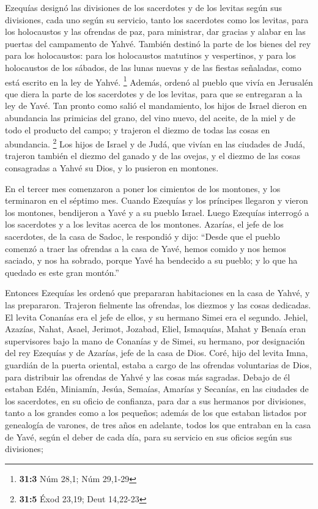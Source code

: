  Ezequías designó las divisiones de los sacerdotes y de
los levitas según sus divisiones, cada uno según su servicio, tanto los
sacerdotes como los levitas, para los holocaustos y las ofrendas de paz,
para ministrar, dar gracias y alabar en las puertas del campamento de
Yahvé.  También destinó la parte de los bienes del rey
para los holocaustos: para los holocaustos matutinos y vespertinos, y
para los holocaustos de los sábados, de las lunas nuevas y de las
fiestas señaladas, como está escrito en la ley de Yahvé. \footnote{\textbf{31:3}
  Núm 28,1; Núm 29,1-29}  Además, ordenó al pueblo que
vivía en Jerusalén que diera la parte de los sacerdotes y de los
levitas, para que se entregaran a la ley de Yavé.  Tan
pronto como salió el mandamiento, los hijos de Israel dieron en
abundancia las primicias del grano, del vino nuevo, del aceite, de la
miel y de todo el producto del campo; y trajeron el diezmo de todas las
cosas en abundancia. \footnote{\textbf{31:5} Éxod 23,19; Deut 14,22-23}
 Los hijos de Israel y de Judá, que vivían en las ciudades
de Judá, trajeron también el diezmo del ganado y de las ovejas, y el
diezmo de las cosas consagradas a Yahvé su Dios, y lo pusieron en
montones.

 En el tercer mes comenzaron a poner los cimientos de los
montones, y los terminaron en el séptimo mes.  Cuando
Ezequías y los príncipes llegaron y vieron los montones, bendijeron a
Yavé y a su pueblo Israel.  Luego Ezequías interrogó a los
sacerdotes y a los levitas acerca de los montones. 
Azarías, el jefe de los sacerdotes, de la casa de Sadoc, le respondió y
dijo: ``Desde que el pueblo comenzó a traer las ofrendas a la casa de
Yavé, hemos comido y nos hemos saciado, y nos ha sobrado, porque Yavé ha
bendecido a su pueblo; y lo que ha quedado es este gran montón.''

 Entonces Ezequías les ordenó que prepararan habitaciones
en la casa de Yahvé, y las prepararon.  Trajeron
fielmente las ofrendas, los diezmos y las cosas dedicadas. El levita
Conanías era el jefe de ellos, y su hermano Simei era el segundo.
 Jehiel, Azazías, Nahat, Asael, Jerimot, Jozabad, Eliel,
Ismaquías, Mahat y Benaía eran supervisores bajo la mano de Conanías y
de Simei, su hermano, por designación del rey Ezequías y de Azarías,
jefe de la casa de Dios.  Coré, hijo del levita Imna,
guardián de la puerta oriental, estaba a cargo de las ofrendas
voluntarias de Dios, para distribuir las ofrendas de Yahvé y las cosas
más sagradas.  Debajo de él estaban Edén, Miniamín,
Jesúa, Semaías, Amarías y Secanías, en las ciudades de los sacerdotes,
en su oficio de confianza, para dar a sus hermanos por divisiones, tanto
a los grandes como a los pequeños;  además de los que
estaban listados por genealogía de varones, de tres años en adelante,
todos los que entraban en la casa de Yavé, según el deber de cada día,
para su servicio en sus oficios según sus divisiones;

